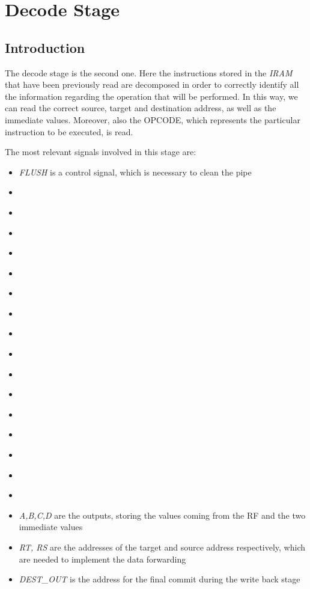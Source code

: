 \section{Decode Stage}
\label{chap_dec}

\subsection{Introduction}
The decode stage is the second one. Here the instructions stored in the \textit{IRAM} that have been previously read are decomposed in order to correctly identify all the information regarding the operation that will be performed. In this way, we can read the correct source, target and destination address, as well as the immediate values. Moreover, also the \textsf{OPCODE}, which represents the particular instruction to be executed, is read.

The most relevant signals involved in this stage are:
\begin{itemize}
	\item \textit{FLUSH} is a control signal, which is necessary to clean the pipe
	\item \textit{}
	\item \textit{}
	\item \textit{}
	\item \textit{}
	\item \textit{}
	\item \textit{}
	\item \textit{}
	\item \textit{}
	\item \textit{}
	\item \textit{}
	\item \textit{}
	\item \textit{}
	\item \textit{}
	\item \textit{}
	\item \textit{}
	\item \textit{}
	\item \textit{A,B,C,D} are the outputs, storing the values coming from the \textsf{RF} and the two immediate values
	\item \textit{RT, RS} are the addresses of the target and source address respectively, which are needed to implement the data forwarding
	\item \textit{DEST\_OUT} is the address for the final commit during the write back stage
\end{itemize}

